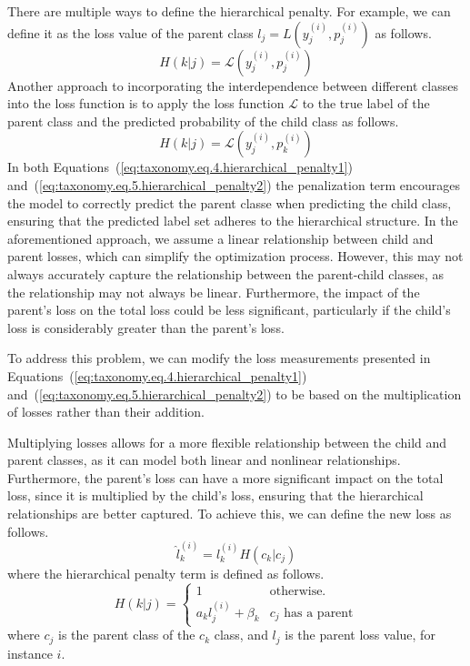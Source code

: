 There are multiple ways to define the hierarchical penalty. For example, we can define it as the loss value of the parent class $l_j=L\left(y_j^{(i)},p_j^{(i)}\right) $ as follows.
\begin{equation}
    H(k \vert j)=\mathcal{L} \left(y_j^{(i)},p_j^{(i)}\right)
    \label{eq:taxonomy.eq.4.hierarchical_penalty1}
\end{equation}
Another approach to incorporating the interdependence between different classes into the loss function is to apply the loss function $\mathcal{L} $ to the true label of the parent class and the predicted probability of the child class as follows.
\begin{equation}
    H\left(k\vert j\right) = \mathcal{L} \left(y_j^{(i)},p_k^{(i)}\right)
    \label{eq:taxonomy.eq.5.hierarchical_penalty2}
\end{equation}
In both Equations~(\ref{eq:taxonomy.eq.4.hierarchical_penalty1}) and~(\ref{eq:taxonomy.eq.5.hierarchical_penalty2}) the penalization term encourages the model to correctly predict the parent classe when predicting the child class, ensuring that the predicted label set adheres to the hierarchical structure. In the aforementioned approach, we assume a linear relationship between child and parent losses, which can simplify the optimization process. However, this may not always accurately capture the relationship between the parent-child classes, as the relationship may not always be linear. Furthermore, the impact of the parent's loss on the total loss could be less significant, particularly if the child's loss is considerably greater than the parent's loss.

To address this problem, we can modify the loss measurements presented in Equations~(\ref{eq:taxonomy.eq.4.hierarchical_penalty1}) and~(\ref{eq:taxonomy.eq.5.hierarchical_penalty2})  to be based on the multiplication of losses rather than their addition.

Multiplying losses allows for a more flexible relationship between the child and parent classes, as it can model both linear and nonlinear relationships. Furthermore, the parent's loss can have a more significant impact on the total loss, since it is multiplied by the child's loss, ensuring that the hierarchical relationships are better captured. To achieve this, we can define the new loss as follows.
\begin{equation}
    \label{eq:taxonomy.eq.7.newloss}
    \widehat{l}_k^{(i)} = l_k^{(i)} H \left( c_k \vert c_j \right)
\end{equation}
where the hierarchical penalty term is defined as follows.
\begin{equation}
    \label{eq:taxonomy.eq.8.hierarchical_penalty.loss}
    H(k \vert j) = \left\{ \begin{array}{lc}1 & \text{otherwise.} \\ a_k l_j^{(i)} + \beta_k & c_j \text{ has a parent} \end{array} \right.
\end{equation}
where $c_j $ is the parent class of the $c_k $ class, and $l_j $ is the parent loss value, for instance $i $.


